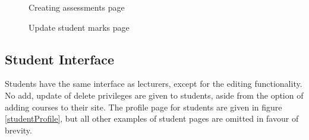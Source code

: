 \documentclass[a4paper,12pt]{article}
\numberwithin{equation}{section} %
\numberwithin{figure}{section}
\begin{document}
\begin{figure}[H]
\minipage[t]{\minipageWidth}
	\centering
	\vspace{-0.2cm}
	\caption{Creating assessments page}
	\label{lecturerCreateAssessment}
\endminipage\hfill
\minipage[t]{\minipageWidth}
	\centering
	\vspace{-0.2cm}
	\caption{Update student marks page}
	\label{lecturerUpdateMarks}
\endminipage
\end{figure}



\subsection{Student Interface}
Students have the same interface as lecturers, except for the editing functionality. No add, update of delete privileges are given to students, aside from the option of adding courses to their site. The profile page for students are given in figure \ref{studentProfile}, but all other examples of student pages are omitted in favour of brevity.
\end{document}
